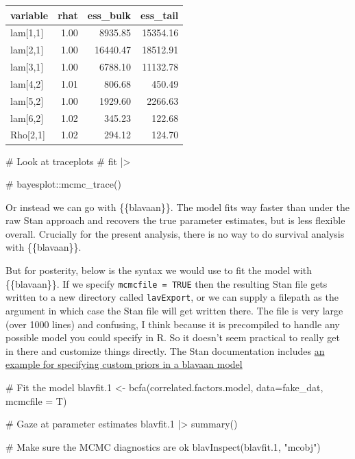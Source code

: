 \documentclass[
  letterpaper,
  DIV=11,
  numbers=noendperiod]{scrreprt}
\newenvironment{Shaded}{\begin{snugshade}}{\end{snugshade}}
\newcommand{\AttributeTok}[1]{\textcolor[rgb]{0.40,0.45,0.13}{#1}}
\newcommand{\CommentTok}[1]{\textcolor[rgb]{0.37,0.37,0.37}{#1}}
\newcommand{\FloatTok}[1]{\textcolor[rgb]{0.68,0.00,0.00}{#1}}
\newcommand{\FunctionTok}[1]{\textcolor[rgb]{0.28,0.35,0.67}{#1}}
\newcommand{\NormalTok}[1]{\textcolor[rgb]{0.00,0.23,0.31}{#1}}
\newcommand{\OtherTok}[1]{\textcolor[rgb]{0.00,0.23,0.31}{#1}}
\newcommand{\SpecialCharTok}[1]{\textcolor[rgb]{0.37,0.37,0.37}{#1}}
\newcommand{\StringTok}[1]{\textcolor[rgb]{0.13,0.47,0.30}{#1}}
\begin{document}
\begin{longtable}[]{@{}lrrr@{}}
\toprule()
variable & rhat & ess\_bulk & ess\_tail \\
\midrule()
\endhead
lam{[}1,1{]} & 1.00 & 8935.85 & 15354.16 \\
lam{[}2,1{]} & 1.00 & 16440.47 & 18512.91 \\
lam{[}3,1{]} & 1.00 & 6788.10 & 11132.78 \\
lam{[}4,2{]} & 1.01 & 806.68 & 450.49 \\
lam{[}5,2{]} & 1.00 & 1929.60 & 2266.63 \\
lam{[}6,2{]} & 1.02 & 345.23 & 122.68 \\
Rho{[}2,1{]} & 1.02 & 294.12 & 124.70 \\
\bottomrule()
\end{longtable}

\begin{Shaded}
\begin{Highlighting}[]
\CommentTok{\# Look at traceplots}
\CommentTok{\# fit |\textgreater{} }

\CommentTok{\#  bayesplot::mcmc\_trace()}
\end{Highlighting}
\end{Shaded}

Or instead we can go with \{\{blavaan\}\}. The model fits way faster
than under the raw Stan approach and recovers the true parameter
estimates, but is less flexible overall. Crucially for the present
analysis, there is no way to do survival analysis with \{\{blavaan\}\}.

But for posterity, below is the syntax we would use to fit the model
with \{\{blavaan\}\}. If we specify \texttt{mcmcfile\ =\ TRUE} then the
resulting Stan file gets written to a new directory called
\texttt{lavExport}, or we can supply a filepath as the argument in which
case the Stan file will get written there. The file is very large (over
1000 lines) and confusing, I think because it is precompiled to handle
any possible model you could specify in R. So it doesn't seem practical
to really get in there and customize things directly. The Stan
documentation includes
\href{https://mc-stan.org/users/documentation/case-studies/sem.html\#Confirmatory_Factor_Analysis_(CFA)}{an
example for specifying custom priors in a blavaan model}

\begin{Shaded}
\begin{Highlighting}[]
\CommentTok{\# Fit the model}
\NormalTok{blavfit}\FloatTok{.1} \OtherTok{\textless{}{-}} \FunctionTok{bcfa}\NormalTok{(correlated.factors.model, }\AttributeTok{data=}\NormalTok{fake\_dat, }\AttributeTok{mcmcfile =}\NormalTok{ T)}

\CommentTok{\# Gaze at parameter estimates}
\NormalTok{blavfit}\FloatTok{.1} \SpecialCharTok{|\textgreater{}} \FunctionTok{summary}\NormalTok{()}

\CommentTok{\# Make sure the MCMC diagnostics are ok}
\FunctionTok{blavInspect}\NormalTok{(blavfit}\FloatTok{.1}\NormalTok{, }\StringTok{"mcobj"}\NormalTok{)}
\end{Highlighting}
\end{Shaded}
\end{document}
